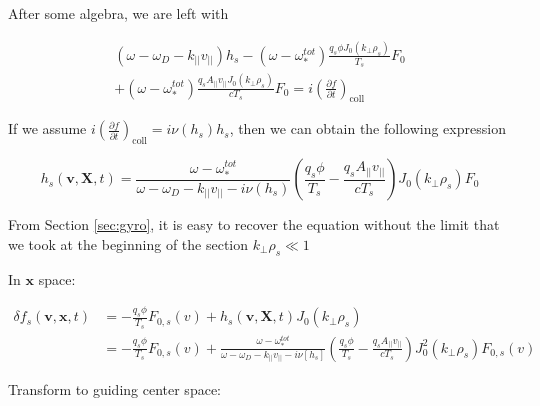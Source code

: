 After some algebra, we are left with 

\begin{equation}
\begin{aligned}
     (\omega -\omega_D 
    - k_{||}v_{||})h_s 
    -(\omega -\omega_*^{tot})\frac{q_s\phi J_0(k_\perp \rho_s)}{T_s}F_0\\
    +(\omega -\omega_*^{tot})\frac{q_sA_{||}v_{||}J_0(k_\perp \rho_s)}{cT_s}F_0
    =i\left(\frac{\partial f}{\partial t}\right)_{\mathrm{coll}}
    \end{aligned}
\end{equation}

If we assume $i\left(\frac{\partial f}{\partial t}\right)_{\mathrm{coll}} = i\nu(h_s) h_s$, then we can obtain the following expression

\begin{equation}
    h_s (\textbf{v},\textbf{X},t)
    =\frac{\omega -\omega_*^{tot} 
    }{\omega -\omega_D 
    - k_{||}v_{||}-i\nu(h_s)}\left(\frac{q_s\phi}{T_s}-\frac{q_sA_{||}v_{||}}{cT_s}\right)J_0(k_\perp \rho_s)F_0
    \label{eq:linear}
\end{equation}

From Section \ref{sec:gyro}, it is easy to recover the equation without the limit that we took at the beginning of the section $k_\perp \rho_s \ll 1$

In $\textbf{x}$ space:

\begin{equation}
\begin{aligned}
    \delta f_s(\textbf{v},\textbf{x},t){}&= -\frac{q_s\phi}{T_s}F_{0,s}(v)+h_s(\textbf{v},\textbf{X},t)J_0(k_\perp \rho_s)\\
    &=-\frac{q_s\phi}{T_s}F_{0,s}(v)+\frac{\omega -\omega_*^{tot} 
    }{\omega -\omega_D 
    - k_{||}v_{||}-i\nu[h_s]}\left(\frac{q_s\phi}{T_s}-\frac{q_sA_{||}v_{||}}{cT_s}\right)J_0^2(k_\perp \rho_s)F_{0,s}(v)
\end{aligned}
\end{equation}

Transform to guiding center space:

